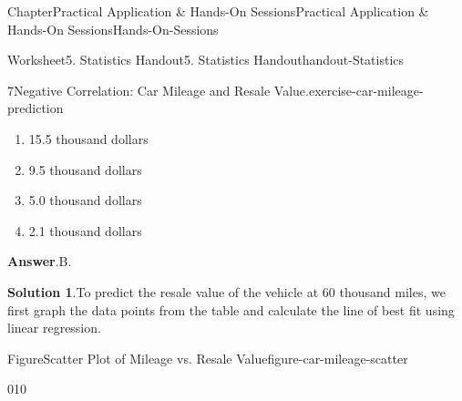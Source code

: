 \documentclass[oneside,10pt,]{book}
\newcommand{\blocktitlefont}{\relax}
\begin{document}
\begin{chapterptx}{Chapter}{Practical Application \& Hands-On Sessions}{}{Practical Application \& Hands-On Sessions}{}{}{Hands-On-Sessions}
\begin{worksheet-section}{Worksheet}{5. Statistics Handout}{}{5. Statistics Handout}{}{}{handout-Statistics}
\begin{divisionexercise}{7}{Negative Correlation: Car Mileage and Resale Value.}{}{exercise-car-mileage-prediction}
\begin{enumerate}[label={\Alph*.}]
\item{}\textdollar{}15.5 thousand dollars%
\item{}\textdollar{}9.5 thousand dollars%
\item{}\textdollar{}5.0 thousand dollars%
\item{}\textdollar{}2.1 thousand dollars%
\end{enumerate}
%
\par\smallskip%
\noindent\textbf{\blocktitlefont Answer}.\hypertarget{exercise-car-mileage-prediction-3}{}\quad{}B.%
\par\smallskip%
\noindent\textbf{\blocktitlefont Solution 1}.\hypertarget{exercise-car-mileage-prediction-4}{}\quad{}To predict the resale value of the vehicle at 60 thousand miles, we first graph the data points from the table and calculate the line of best fit using linear regression.%
\par
 \begin{figureptx}{Figure}{Scatter Plot of Mileage vs. Resale Value}{figure-car-mileage-scatter}{}%
\begin{image}{0}{1}{0}{}%
\end{image}
\end{figureptx}
\end{divisionexercise}
\end{worksheet-section}
\end{chapterptx}
\end{document}
